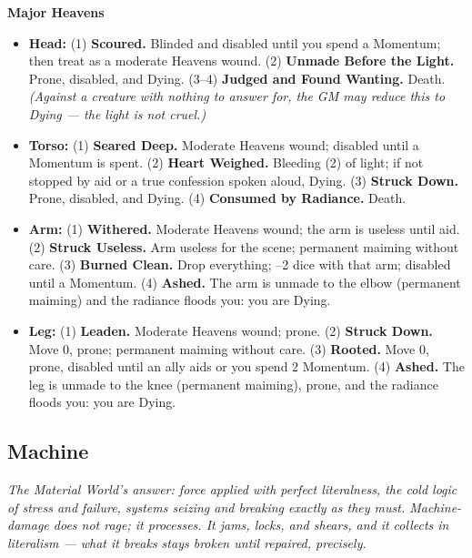 \textbf{Major Heavens}
\begin{itemize}
    \item \textbf{Head:} (1) \textbf{Scoured.} Blinded and disabled until you spend a Momentum; then treat as a moderate Heavens wound. (2) \textbf{Unmade Before the Light.} Prone, disabled, and Dying. (3--4) \textbf{Judged and Found Wanting.} Death. \textit{(Against a creature with nothing to answer for, the GM may reduce this to Dying --- the light is not cruel.)}
    \item \textbf{Torso:} (1) \textbf{Seared Deep.} Moderate Heavens wound; disabled until a Momentum is spent. (2) \textbf{Heart Weighed.} Bleeding (2) of light; if not stopped by aid or a true confession spoken aloud, Dying. (3) \textbf{Struck Down.} Prone, disabled, and Dying. (4) \textbf{Consumed by Radiance.} Death.
    \item \textbf{Arm:} (1) \textbf{Withered.} Moderate Heavens wound; the arm is useless until aid. (2) \textbf{Struck Useless.} Arm useless for the scene; permanent maiming without care. (3) \textbf{Burned Clean.} Drop everything; --2 dice with that arm; disabled until a Momentum. (4) \textbf{Ashed.} The arm is unmade to the elbow (permanent maiming) and the radiance floods you: you are Dying.
    \item \textbf{Leg:} (1) \textbf{Leaden.} Moderate Heavens wound; prone. (2) \textbf{Struck Down.} Move 0, prone; permanent maiming without care. (3) \textbf{Rooted.} Move 0, prone, disabled until an ally aids or you spend 2 Momentum. (4) \textbf{Ashed.} The leg is unmade to the knee (permanent maiming), prone, and the radiance floods you: you are Dying.
\end{itemize}

\subsection{Machine}

\textit{The Material World's answer: force applied with perfect literalness, the cold logic of stress and failure, systems seizing and breaking exactly as they must. Machine-damage does not rage; it processes. It jams, locks, and shears, and it collects in literalism --- what it breaks stays broken until repaired, precisely.}

